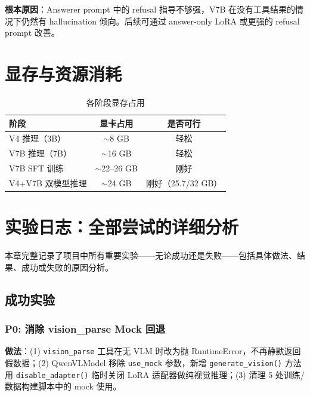 \documentclass[12pt,a4paper]{ctexart}
\begin{document}
\textbf{根本原因}：Answerer prompt 中的 refusal 指导不够强，V7B 在没有工具结果的情况下仍然有 hallucination 倾向。后续可通过 answer-only LoRA 或更强的 refusal prompt 改善。

\section{显存与资源消耗}

\begin{table}[H]
\centering
\caption{各阶段显存占用}
\begin{tabular}{lcc}
\toprule
阶段 & 显卡占用 & 是否可行 \\
\midrule
V4 推理（3B） & $\sim$8 GB & 轻松 \\
V7B 推理（7B） & $\sim$16 GB & 轻松 \\
V7B SFT 训练 & $\sim$22--26 GB & 刚好 \\
V4+V7B 双模型推理 & $\sim$24 GB & 刚好（25.7/32 GB）\\
\bottomrule
\end{tabular}
\end{table}

\section{实验日志：全部尝试的详细分析}

本章完整记录了项目中所有重要实验——无论成功还是失败——包括具体做法、结果、成功或失败的原因分析。

\subsection{成功实验}

\subsubsection{P0: 消除 vision\_parse Mock 回退}

\textbf{做法}：(1) \texttt{vision\_parse} 工具在无 VLM 时改为抛 RuntimeError，不再静默返回假数据；(2) QwenVLModel 移除 \texttt{use\_mock} 参数，新增 \texttt{generate\_vision()} 方法用 \texttt{disable\_adapter()} 临时关闭 LoRA 适配器做纯视觉推理；(3) 清理 5 处训练/数据构建脚本中的 mock 使用。
\end{document}

